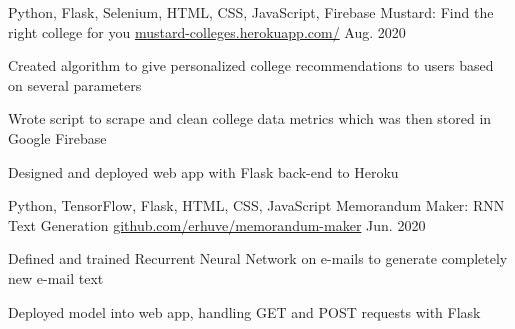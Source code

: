 

\begin{cventries}

  \cventry
    {Python, Flask, Selenium, HTML, CSS, JavaScript, Firebase} %
    {Mustard: Find the right college for you} %
    {\href{http://mustard-colleges.herokuapp.com/}{mustard-colleges.herokuapp.com/}} %
    {Aug. 2020} %
    {
      \begin{cvitems} %
        \item {Created algorithm to give personalized college recommendations to users based on several parameters}
        \item {Wrote script to scrape and clean college data metrics which was then stored in Google Firebase}
        \item {Designed and deployed web app with Flask back-end to Heroku}
      \end{cvitems}
    }

  \cventry
    {Python, TensorFlow, Flask, HTML, CSS, JavaScript} %
    {Memorandum Maker: RNN Text Generation} %
    {\href{https://github.com/erhuve/memorandum-maker}{github.com/erhuve/memorandum-maker}} %
    {Jun. 2020} %
    {
      \begin{cvitems} %
        \item {Defined and trained Recurrent Neural Network on e-mails to generate completely new e-mail text}
        \item {Deployed model into web app, handling GET and POST requests with Flask}
      \end{cvitems}
    }
\end{cventries}
